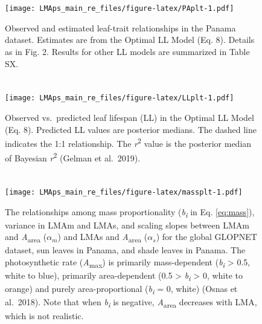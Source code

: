 \documentclass[
  12pt,
]{article}
\begin{document}
\newpage

\hypertarget{section-3}{%
\section{}\label{section-3}}

\begin{figure}
\centering
\texttt{[image: LMAps\_main\_re\_files/figure-latex/PAplt-1.pdf]}
\caption{\label{fig:PAplt}Observed and estimated leaf-trait relationships in the Panama dataset. Estimates are from the Optimal LL Model (Eq. 8). Details as in Fig. 2. Results for other LL models are summarized in Table SX.}
\end{figure}

\newpage

\hypertarget{section-4}{%
\section{}\label{section-4}}

\begin{figure}
\centering
\texttt{[image: LMAps\_main\_re\_files/figure-latex/LLplt-1.pdf]}
\caption{\label{fig:LLplt}Observed vs.~predicted leaf lifespan (LL) in the Optimal LL Model (Eq. 8). Predicted LL values are posterior medians. The dashed line indicates the 1:1 relationship. The \emph{r}\textsuperscript{2} value is the posterior median of Bayesian \emph{r}\textsuperscript{2} (Gelman et al.~2019).}
\end{figure}

\newpage

\hypertarget{section-5}{%
\section{}\label{section-5}}

\begin{figure}
\centering
\texttt{[image: LMAps\_main\_re\_files/figure-latex/massplt-1.pdf]}
\caption{\label{fig:massplt}The relationships among mass proportionality (\emph{b\textsubscript{i}} in Eq. \eqref{eq:mass}), variance in LMAm and LMAs, and scaling slopes between LMAm and \emph{A}\textsubscript{area} (\(\alpha_m\)) and LMAs and \emph{A}\textsubscript{area} (\(\alpha_s\)) for the global GLOPNET dataset, sun leaves in Panama, and shade leaves in Panama. The photosynthetic rate (\emph{A}\textsubscript{max}) is primarily mass-dependent (\emph{b\textsubscript{i}} \textgreater{} 0.5, white to blue), primarily area-dependent (0.5 \textgreater{} \emph{b\textsubscript{i}} \textgreater{} 0, white to orange) and purely area-proportional (\emph{b\textsubscript{i}} = 0, white) (Osnas et al.~2018). Note that when \emph{b\textsubscript{i}} is negative, \emph{A}\textsubscript{area} decreases with LMA, which is not realistic.}
\end{figure}
\end{document}
